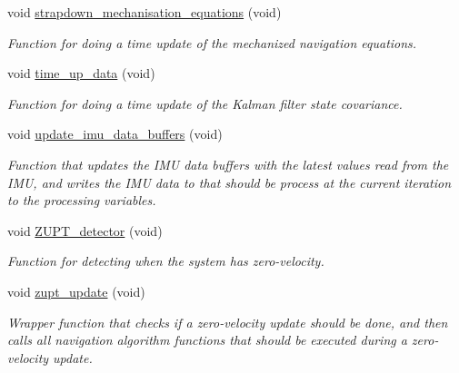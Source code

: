 \begin{DoxyCompactItemize}
void \hyperlink{group__nav__eq_ga9169808fbcb9f517deb908960a69ca7a}{strapdown\-\_\-mechanisation\-\_\-equations} (void)
\begin{DoxyCompactList}\small\item\em \-Function for doing a time update of the mechanized navigation equations. \end{DoxyCompactList}\item 
void \hyperlink{group__nav__eq_gac80ad2aa648edb47edb8f62883cb2a7d}{time\-\_\-up\-\_\-data} (void)
\begin{DoxyCompactList}\small\item\em \-Function for doing a time update of the \-Kalman filter state covariance. \end{DoxyCompactList}\item 
void \hyperlink{group__nav__eq_gaae1bbd924940610e1709300d40ca5a0f}{update\-\_\-imu\-\_\-data\-\_\-buffers} (void)
\begin{DoxyCompactList}\small\item\em \-Function that updates the \-I\-M\-U data buffers with the latest values read from the \-I\-M\-U, and writes the \-I\-M\-U data to that should be process at the current iteration to the processing variables. \end{DoxyCompactList}\item 
void \hyperlink{group__nav__eq_gaf0b7424f50d37755b6b0736808082299}{\-Z\-U\-P\-T\-\_\-detector} (void)
\begin{DoxyCompactList}\small\item\em \-Function for detecting when the system has zero-\/velocity. \end{DoxyCompactList}\item 
void \hyperlink{group__nav__eq_ga0b4ee34435eebb426eb367120ee79d72}{zupt\-\_\-update} (void)
\begin{DoxyCompactList}\small\item\em \-Wrapper function that checks if a zero-\/velocity update should be done, and then calls all navigation algorithm functions that should be executed during a zero-\/velocity update. \end{DoxyCompactList}\end{DoxyCompactItemize}
